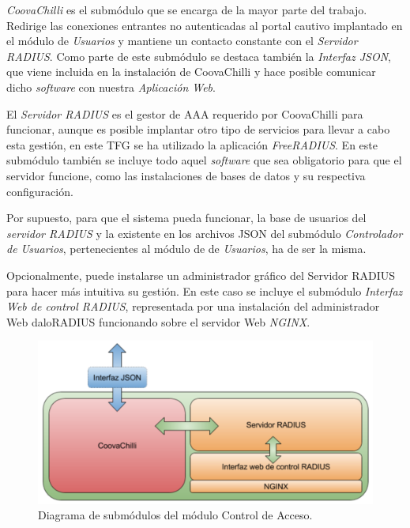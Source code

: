 \emph{CoovaChilli} es el submódulo que se encarga de la mayor parte del trabajo. Redirige las conexiones entrantes no autenticadas al portal cautivo implantado en el módulo de \emph{Usuarios} y mantiene un contacto constante con el \emph{Servidor RADIUS}. Como parte de este submódulo se destaca también la \emph{Interfaz JSON}, que viene incluida en la instalación de CoovaChilli y hace posible comunicar dicho \emph{software} con nuestra \emph{Aplicación Web}.

El \emph{Servidor RADIUS} es el gestor de AAA requerido por CoovaChilli para funcionar, aunque es posible implantar otro tipo de servicios para llevar a cabo esta gestión, en este TFG se ha utilizado la aplicación \emph{FreeRADIUS}. En este submódulo también se incluye todo aquel \emph{software} que sea obligatorio para que el servidor funcione, como las instalaciones de bases de datos y su respectiva configuración.

Por supuesto, para que el sistema pueda funcionar, la base de usuarios del \emph{servidor RADIUS} y la existente en los archivos JSON del submódulo \emph{Controlador de Usuarios}, pertenecientes al módulo de de \emph{Usuarios}, ha de ser la misma.

Opcionalmente, puede instalarse un administrador gráfico del Servidor RADIUS para hacer más intuitiva su gestión. En este caso se incluye el submódulo \emph{Interfaz Web de control RADIUS}, representada por una instalación del administrador Web daloRADIUS funcionando sobre el servidor Web \emph{NGINX}.

\begin{figure}[!t]
\begin{center}
\includegraphics[width=0.75\linewidth]{./4_AnalisisFuncional/Img/moduloControlAcceso.png}
\end{center}
\caption{Diagrama de submódulos del módulo Control de Acceso.}
\label{moduloControlAcceso}
\end{figure}

